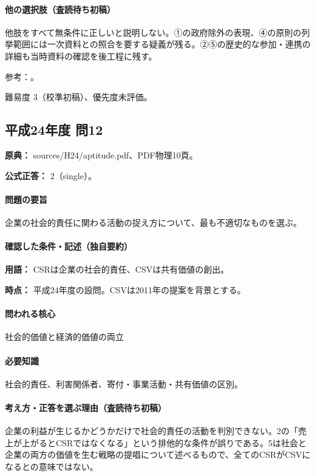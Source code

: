 \paragraph{他の選択肢（査読待ち初稿）} 他肢をすべて無条件に正しいと説明しない。①の政府除外の表現、④の原則の列挙範囲には一次資料との照合を要する疑義が残る。②⑤の歴史的な参加・連携の詳細も当時資料の確認を後工程に残す。

\par 参考：\cite{iso26000}。

\par 難易度 3（校準初稿）、優先度未評価。

\subsection{平成24年度 問12}
\label{q:h24-reg-apt-12}

\noindent\textbf{原典：} sources/H24/aptitude.pdf、PDF物理10頁。

\textbf{公式正答：} 2（single）。

\paragraph{問題の要旨} 企業の社会的責任に関わる活動の捉え方について、最も不適切なものを選ぶ。

\paragraph{確認した条件・記述（独自要約）}\mbox{}\par

\noindent\textbf{用語：} CSRは企業の社会的責任、CSVは共有価値の創出。\par

\noindent\textbf{時点：} 平成24年度の設問。CSVは2011年の提案を背景とする。\par

\paragraph{問われる核心} 社会的価値と経済的価値の両立

\paragraph{必要知識} 社会的責任、利害関係者、寄付・事業活動・共有価値の区別。

\paragraph{考え方・正答を選ぶ理由（査読待ち初稿）} 企業の利益が生じるかどうかだけで社会的責任の活動を判別できない。2の「売上が上がるとCSRではなくなる」という排他的な条件が誤りである。5は社会と企業の両方の価値を生む戦略の提唱について述べるもので、全てのCSRがCSVになるとの意味ではない。

